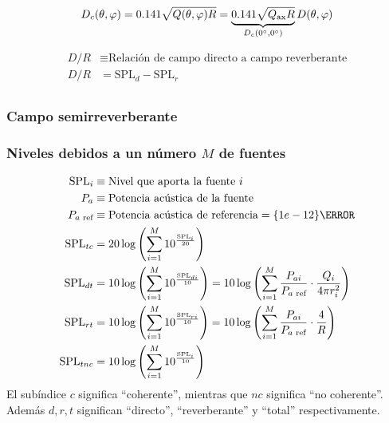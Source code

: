 \documentclass[a4paper, 8pt]{extarticle}
\begin{document}
\begin{multicols}{3}
  \[ D_c (\theta, \varphi) = 0.141 \sqrt{Q(\theta,\varphi)R} = \underbrace{0.141 \sqrt{Q _{\textnormal{ax}}R}} _{D_c(\ang{0},\ang{0})} D(\theta, \varphi) \]

  \begin{align*}
    D/R & \equiv \text{Relación de campo directo a campo reverberante} \\
    D/R & = \text{SPL}_d - \text{SPL}_r                                \\
  \end{align*}

  \subsubsection{Campo semirreverberante}
  \subsubsection{Niveles debidos a un número $M$ de fuentes}
  \begin{align*}
    \text{SPL}_{i}           & \equiv \text{Nivel que aporta la fuente }i                                                                                                                                         \\
    P _{a}                   & \equiv \text{Potencia acústica de la fuente}                                                                                                                                       \\
    P _{a \textnormal{ ref}} & \equiv \text{Potencia acústica de referencia} = \qty{1e-12}{\watt}                                                                                                                 \\
    \text{SPL}_{tc}          & = 20 \log \left( \sum_{i=1}^{M} 10^{\frac{\text{SPL}_i}{20}} \right)                                                                                                               \\
    \text{SPL}_{dt}          & = 10 \log \left( \sum_{i=1}^{M} 10^{\frac{\text{SPL}_{di}}{10}} \right) = 10 \log \left( \sum_{i=1}^{M} \frac{P_{ai}}{P_{a \textnormal{ ref}}} \cdot \frac{Q_i}{4\pi r_i^2}\right) \\
    \text{SPL}_{rt}          & = 10 \log \left( \sum_{i=1}^{M} 10^{\frac{\text{SPL}_{ri}}{10}} \right) = 10 \log \left( \sum_{i=1}^{M} \frac{P_{ai}}{P_{a \textnormal{ ref}}} \cdot \frac{4}{R}\right)            \\
    \text{SPL}_{tnc}         & = 10 \log \left( \sum_{i=1}^{M} 10^{\frac{\text{SPL}_i}{10}} \right)                                                                                                               \\
  \end{align*}
  El subíndice $c$ significa ``coherente'', mientras que $nc$ significa ``no coherente''. Además $d, r, t$ significan ``directo'', ``reverberante'' y ``total'' respectivamente.

\end{multicols}
\end{document}
